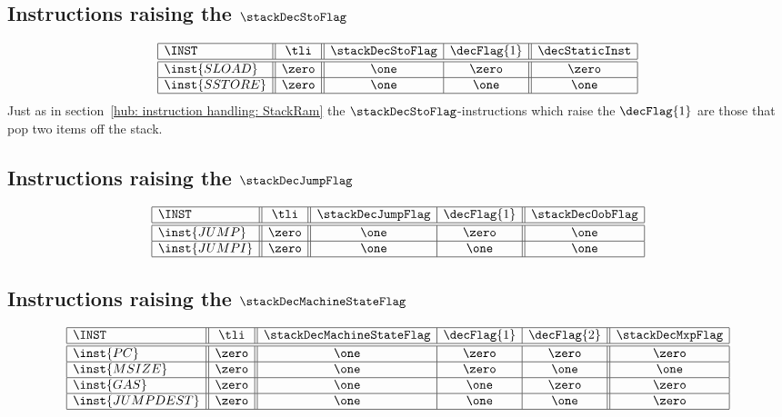 \subsection{Instructions raising the $\stackDecStoFlag$}
\label{hub: instruction handling: Sto}

\[
\begin{array}{|l||c||c|c||c|}
	\hline
	\INST			& \tli	& \stackDecStoFlag	& \decFlag{1}	& \decStaticInst	\\ \hline\hline
	\inst{SLOAD}	& \zero	& \one			& \zero			& \zero				\\ \hline
	\inst{SSTORE}	& \zero	& \one			& \one			& \one				\\ \hline
\end{array}
\]
\saNote{} Just as in section~\ref{hub: instruction handling: StackRam} the $\stackDecStoFlag$-instructions which raise the $\decFlag{1}$ are those that pop two items off the stack.

\subsection{Instructions raising the $\stackDecJumpFlag$}
\label{hub: instruction handling: Jump}

\[
\begin{array}{|l||c||c|c||c|}
	\hline
	\INST 			& \tli	& \stackDecJumpFlag	& \decFlag{1}	& \stackDecOobFlag	\\ \hline\hline
	\inst{JUMP}		& \zero	& \one			& \zero			& \one			\\ \hline
	\inst{JUMPI}	& \zero	& \one			& \one			& \one			\\ \hline
\end{array}
\]

\subsection{Instructions raising the $\stackDecMachineStateFlag$}
\label{hub: instruction handling: MachineState}

\[
\begin{array}{|l||c||c|c|c||c|}
	\hline
	\INST			& \tli 	& \stackDecMachineStateFlag	& \decFlag{1}	& \decFlag{2}	& \stackDecMxpFlag	\\ \hline\hline
	\inst{PC}		& \zero & \one					& \zero			& \zero			& \zero			\\ \hline
	\inst{MSIZE}	& \zero & \one					& \zero			& \one			& \one			\\ \hline
	\inst{GAS}		& \zero & \one					& \one			& \zero			& \zero			\\ \hline
	\inst{JUMPDEST}	& \zero & \one					& \one			& \one			& \zero			\\ \hline
\end{array}
\]

